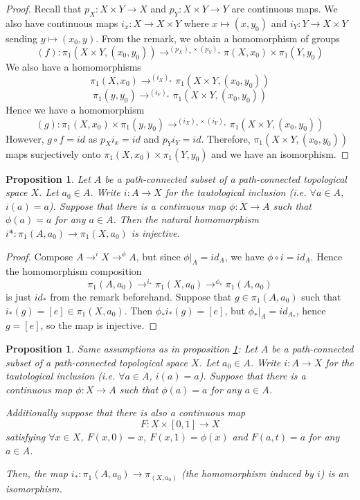 \documentclass{article}
\theoremstyle{definition}
\theoremstyle{plain}%
\newtheorem{prop}[thm]{Proposition}
\theoremstyle{remark}
\begin{document}
\begin{proof}
     Recall that $p_X : X \times Y \to X$ and $p_Y : X \times Y \to Y$ are continuous maps. We also have continuous maps $i_x : X \to X \times Y$ where $x \mapsto (x, y_0)$ and $i_Y: Y \to X \times Y$ sending $y \mapsto (x_0, y)$. From the remark, we obtain a homomorphism of groups
     \[(f): \pi_1(X \times Y, (x_0, y_0)) \to^{(p_X)_* \times (p_Y)_*} \pi(X, x_0) \times \pi_1(Y, y_0)\]
     We also have a homomorphisms
     \[\pi_1(X, x_0) \to^{(i_X)_*} \pi_1(X \times Y, (x_0, y_0))\]
     \[\pi_1(y, y_0) \to^{(i_Y)_*} \pi_1(X \times Y, (x_0, y_0))\]
     Hence we have a homomorphism
     \[(g):\pi_1(X, x_0) \times \pi_1(y, y_0) \to^{(i_X)_* \times (i_Y)_*} \pi_1(X \times Y, (x_0, y_0))\]
     However, $g \circ f = id$ as $p_X i_x = id$ and $p_Y i_Y = id$. Therefore, $\pi_1(X \times Y, (x_0, y_0))$ maps surjectively onto $\pi_1(X, x_0) \times \pi_1(Y, y_0)$ and we have an isomorphism.
\end{proof}

\begin{prop}\label{injective homomorphism}
    Let $A$ be a path-connected subset of a path-connected topological space $X$. Let $a_0 \in A$. Write $i : A \to X$ for the tautological inclusion (i.e. $\forall a \in A$, $i(a) = a$). Suppose that there is a continuous map $\phi : X \to A$ such that $\phi(a) = a$ for any $a \in A$. Then the natural homomorphism $i* : \pi_1(A, a_0) \to \pi_1(X,a_0)$ is injective.
\end{prop}

\begin{proof}
     Compose $A \to^{i} X \to^{\phi} A$, but since $\phi |_A = id_A$, we have $\phi \circ i = id_A$. Hence the homomorphism composition
     \[\pi_1(A, a_0) \to^{i_*} \pi_1(X, a_0) \to^{\phi_*} \pi_1(A, a_0)\]
     is just $id_*$ from the remark beforehand. Suppose that $g \in \pi_1(A,a_0)$ such that $i_*(g) = [e] \in \pi_1(X,a_0)$. Then $\phi_* i_* (g) = [e]$, but $\phi_* |_A = id_{A_*}$, hence $g = [e]$, so the map is injective.
\end{proof}

\begin{prop}
    Same assumptions as in proposition \ref{injective homomorphism}: Let $A$ be a path-connected subset of a path-connected topological space $X$. Let $a_0 \in A$. Write $i : A \to X$ for the tautological inclusion (i.e. $\forall a \in A$, $i(a) = a$). Suppose that there is a continuous map $\phi : X \to A$ such that $\phi(a) = a$ for any $a \in A$.
    
    Additionally suppose that there is also a continuous map
    \[F: X \times [0,1] \to X\]
    satisfying $\forall x \in X$, $F(x,0) = x$, $F(x,1) = \phi(x)$ and $F(a,t) = a$ for any $a \in A$.
    
    Then, the map $i_* : \pi_1(A, a_0) \to \pi_(X, a_0)$ (the homomorphism induced by $i$)  is an isomorphism.
\end{prop}
\end{document}
